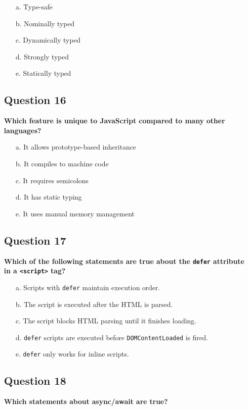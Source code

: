 \documentclass{article}
\begin{document}
\begin{itemize}
  \item[a.] Type-safe
  \item[b.] Nominally typed
  \item[c.] Dynamically typed
  \item[d.] Strongly typed
  \item[e.] Statically typed
\end{itemize}

\subsection*{Question 16}
\textbf{Which feature is unique to JavaScript compared to many other languages?}

\begin{itemize}
  \item[a.] It allows prototype-based inheritance
  \item[b.] It compiles to machine code
  \item[c.] It requires semicolons
  \item[d.] It has static typing
  \item[e.] It uses manual memory management
\end{itemize}

\subsection*{Question 17}
\textbf{Which of the following statements are true about the \texttt{defer} attribute in a \texttt{<script>} tag?}

\begin{itemize}
  \item[a.] Scripts with \texttt{defer} maintain execution order.
  \item[b.] The script is executed after the HTML is parsed.
  \item[c.] The script blocks HTML parsing until it finishes loading.
  \item[d.] \texttt{defer} scripts are executed before \texttt{DOMContentLoaded} is fired.
  \item[e.] \texttt{defer} only works for inline scripts.
\end{itemize}

\subsection*{Question 18}
\textbf{Which statements about async/await are true?}
\end{document}
